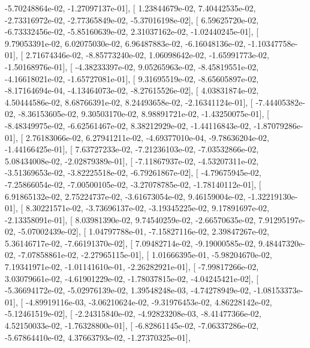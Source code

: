 \documentclass{article}
\begin{document}
         -5.70248864e-02,  -1.27097137e-01],
       [  1.23844679e-02,   7.40442535e-02,  -2.73316972e-02,
         -2.77365849e-02,  -5.37016198e-02],
       [  6.59625720e-02,  -6.73332456e-02,  -5.85160639e-02,
          2.31037162e-02,  -1.02440245e-01],
       [  9.79053391e-02,   6.02075030e-02,   6.96487883e-02,
         -6.16048136e-02,  -1.10347758e-01],
       [  2.71674346e-02,  -8.85773240e-02,   1.06098642e-02,
         -1.65991773e-02,  -1.50168976e-01],
       [ -4.38233397e-02,   9.05265963e-02,  -8.45819551e-02,
         -4.16618021e-02,  -1.65727081e-01],
       [  9.31695519e-02,  -8.65605897e-02,  -8.17164694e-04,
         -4.13464073e-02,  -8.27615526e-02],
       [  4.03831874e-02,   4.50444586e-02,   8.68766391e-02,
          8.24493658e-02,  -2.16341124e-01],
       [ -7.44405382e-02,  -8.36153605e-02,   9.30503170e-02,
          8.98891721e-02,  -1.43250075e-01],
       [ -8.48349975e-02,  -6.62561467e-02,   8.38212929e-02,
         -1.44116843e-02,  -1.87079286e-01],
       [  2.76183066e-02,   6.27941211e-02,  -4.69377010e-04,
         -9.78636204e-02,  -1.44166425e-01],
       [  7.63727233e-02,  -7.21236103e-02,  -7.03532866e-02,
          5.08434008e-02,  -2.02879389e-01],
       [ -7.11867937e-02,  -4.53207311e-02,  -3.51369653e-02,
         -3.82225518e-02,  -6.79261867e-02],
       [ -4.79675945e-02,  -7.25866054e-02,  -7.00500105e-02,
         -3.27078785e-02,  -1.78140112e-01],
       [  6.91865132e-02,   2.75224737e-02,  -3.61673054e-02,
          9.46159004e-02,  -1.32219130e-01],
       [  8.30221571e-02,  -3.73696137e-02,  -3.19345225e-02,
          9.17891697e-02,  -2.13358091e-01],
       [  8.03981390e-02,   9.74540259e-02,  -2.66570635e-02,
          7.91295197e-02,  -5.07002439e-02],
       [  1.04797788e-01,  -7.15827116e-02,   2.39847267e-02,
          5.36146717e-02,  -7.66191370e-02],
       [  7.09482714e-02,  -9.19000585e-02,   9.48447320e-02,
         -7.07858861e-02,  -2.27965115e-01],
       [  1.01666395e-01,  -5.98204670e-02,   7.19341971e-02,
         -1.01141610e-01,  -2.26282921e-01],
       [ -7.99817266e-02,   3.03079661e-02,  -4.61901229e-02,
         -1.78037815e-02,  -4.04245421e-02],
       [ -5.36694172e-02,  -5.02976139e-02,   1.39548248e-03,
         -4.74278949e-02,  -1.08153373e-01],
       [ -4.89919116e-03,  -3.06210624e-02,  -9.31976453e-02,
          4.86228142e-02,  -5.12461519e-02],
       [ -2.24315840e-02,  -4.92823208e-03,  -8.41477366e-02,
          4.52150033e-02,  -1.76328800e-01],
       [ -6.82861145e-02,  -7.06337286e-02,  -5.67864410e-02,
          4.37663793e-02,  -1.27370325e-01],
\end{document}
